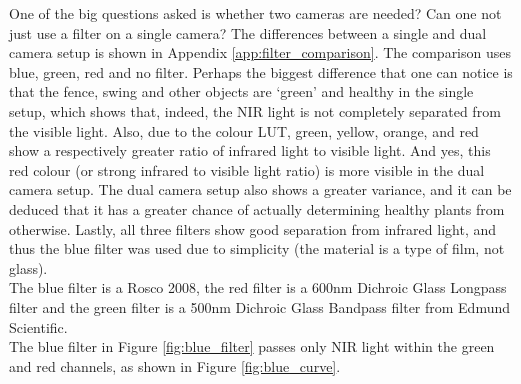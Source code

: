 One of the big questions asked is whether two cameras are needed? Can one not just use a filter on a single camera? The differences between a single and dual camera setup is shown in Appendix \ref{app:filter_comparison}. The comparison uses blue, green, red and no filter. Perhaps the biggest difference that one can notice is that the fence, swing and other objects are `green' and healthy in the single setup, which shows that, indeed, the NIR light is not completely separated from the visible light. Also, due to the colour LUT, green, yellow, orange, and red show a respectively greater ratio of infrared light to visible light. And yes, this red colour (or strong infrared to visible light ratio) is more visible in the dual camera setup. The dual camera setup also shows a greater variance, and it can be deduced that it has a greater chance of actually determining healthy plants from otherwise. Lastly, all three filters show good separation from infrared light, and thus the blue filter was used due to simplicity (the material is a type of film, not glass).\\


The blue filter is a Rosco 2008, the red filter is a 600nm Dichroic Glass Longpass filter and the green filter is a 500nm Dichroic Glass Bandpass filter from Edmund Scientific.\\

The blue filter in Figure \ref{fig:blue_filter} passes only NIR light within the green and red channels, as shown in Figure \ref{fig:blue_curve}.

